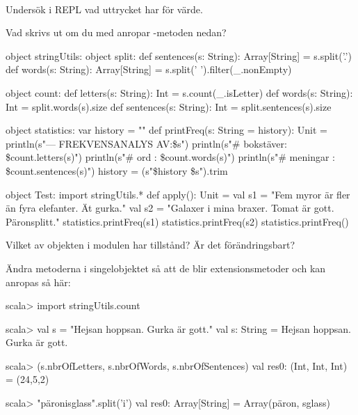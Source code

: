 
\QUESTBEGIN

\Task  \what~

\Subtask Undersök i REPL vad uttrycket  har för värde.

\Subtask Vad skrivs ut om du med  anropar -metoden nedan?
\begin{CodeSmall}
object stringUtils:
  object split:
    def sentences(s: String): Array[String] = s.split('.')
    def words(s: String): Array[String] = s.split(' ').filter(_.nonEmpty)

  object count:
    def letters(s: String):   Int = s.count(_.isLetter)
    def words(s: String):     Int = split.words(s).size
    def sentences(s: String): Int = split.sentences(s).size

  object statistics:
    var history = ""
    def printFreq(s: String = history): Unit =
      println(s"\n--- FREKVENSANALYS AV:\n\$s")
      println(s"# bokstäver: \${count.letters(s)}")
      println(s"# ord      : \${count.words(s)}")
      println(s"# meningar : \${count.sentences(s)}")
      history = (s"\$history \$s").trim

object Test:
  import stringUtils.*
  def apply(): Unit =
    val s1 = "Fem     myror är fler än fyra elefanter. Ät gurka."
    val s2 = "Galaxer i mina braxer. Tomat är gott. Päronsplitt."
    statistics.printFreq(s1)
    statistics.printFreq(s2)
    statistics.printFreq()
\end{CodeSmall}

\Subtask Vilket av objekten i modulen  har tillstånd? Är det förändringsbart?

\Subtask Ändra metoderna i singelobjektet  så att de blir extensionsmetoder och kan anropas så här:
\begin{REPLnonum}
scala> import stringUtils.count

scala>  val s = "Hejsan hoppsan. Gurka är gott."
val s: String = Hejsan hoppsan. Gurka är gott.
                                                                                                                               
scala>  (s.nbrOfLetters, s.nbrOfWords, s.nbrOfSentences)
val res0: (Int, Int, Int) = (24,5,2)
\end{REPLnonum}


\SOLUTION


\TaskSolved \what

\SubtaskSolved
\begin{REPLnonum}
scala> "päronisglass".split('i')
val res0: Array[String] = Array(päron, sglass)
\end{REPLnonum}

